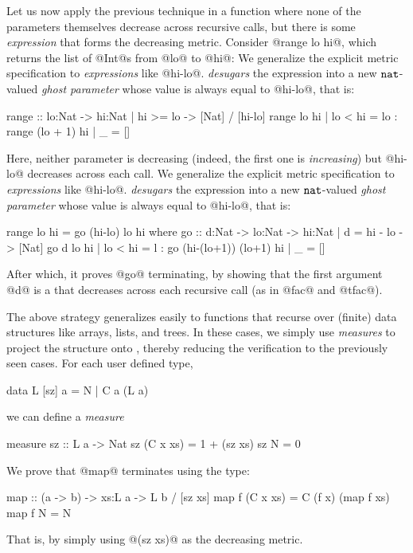 Let us now apply the previous technique in a function where
none of the parameters themselves decrease across recursive calls,
but there is some \emph{expression} that forms the decreasing metric.
%
%
Consider @range lo hi@, which returns the list of 
@Int@s from @lo@ to @hi@:
%
We generalize the explicit metric specification to 
\emph{expressions} like @hi-lo@. \toolname \emph{desugars} the 
expression into a new $\mathtt{nat}$-valued \emph{ghost parameter} 
whose value is always equal to @hi-lo@, that is:
\begin{code}
  range :: lo:Nat -> {hi:Nat | hi >= lo} -> [Nat] 
         / [hi-lo]
  range lo hi 
    | lo < hi = lo : range (lo + 1) hi
    | _       = [] 
\end{code}
%
Here, neither parameter is decreasing (indeed, the first one
is \emph{increasing}) but @hi-lo@ decreases across each call. 
%
We generalize the explicit metric specification to 
\emph{expressions} like @hi-lo@. \toolname \emph{desugars} the 
expression into a new $\mathtt{nat}$-valued \emph{ghost parameter} 
whose value is always equal to @hi-lo@, that is:
%
\begin{code}
  range lo hi = go (hi-lo) lo hi
    where 
      go :: d:Nat -> lo:Nat 
         -> {hi:Nat | d = hi - lo} -> [Nat]
      go d lo hi
       | lo < hi = l : go (hi-(lo+1)) (lo+1) hi 
       | _       = []
\end{code}
%
After which, it proves @go@ terminating, by showing 
that the first argument @d@ is a \tnat that decreases across each 
recursive call (as in @fac@ and @tfac@).

The above strategy generalizes easily to functions that recurse
over (finite) data structures like arrays, lists, and trees.
In these cases, we simply use \emph{measures} to project the 
structure onto \tnat, thereby reducing the verification to 
the previously seen cases. For each user defined type, \eg
%
\begin{code}
  data L [sz] a = N | C a (L a)
\end{code}
%
we can define a \emph{measure}
%
\begin{code}
  measure sz  :: L a -> Nat
    sz (C x xs) = 1 + (sz xs)
    sz N        = 0
\end{code}
%
We prove that @map@ terminates using the type:
%
\begin{code}
  map :: (a -> b) -> xs:L a -> L b / [sz xs]
  map f (C x xs) = C (f x) (map f xs)
  map f N        = N
\end{code}
%
That is, by simply using @(sz xs)@  as the 
decreasing metric.

